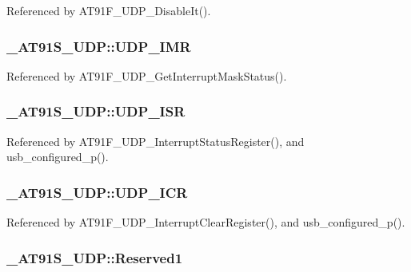 Referenced by AT91F\_\-UDP\_\-DisableIt().\hypertarget{struct__AT91S__UDP_deaa26682a0a229b8560074ce9030351}{
\subsubsection{ {\bf \_\-AT91S\_\-UDP::UDP\_\-IMR}}}
\label{struct__AT91S__UDP_deaa26682a0a229b8560074ce9030351}




Referenced by AT91F\_\-UDP\_\-GetInterruptMaskStatus().\hypertarget{struct__AT91S__UDP_83b861d5cf938b16d0f9a2b06ad428d9}{
\subsubsection{ {\bf \_\-AT91S\_\-UDP::UDP\_\-ISR}}}
\label{struct__AT91S__UDP_83b861d5cf938b16d0f9a2b06ad428d9}




Referenced by AT91F\_\-UDP\_\-InterruptStatusRegister(), and usb\_\-configured\_\-p().\hypertarget{struct__AT91S__UDP_a3b6e0d2334899b4d3c77665b38650ff}{
\subsubsection{ {\bf \_\-AT91S\_\-UDP::UDP\_\-ICR}}}
\label{struct__AT91S__UDP_a3b6e0d2334899b4d3c77665b38650ff}




Referenced by AT91F\_\-UDP\_\-InterruptClearRegister(), and usb\_\-configured\_\-p().\hypertarget{struct__AT91S__UDP_269c69151e7a68327cfc230b3f694508}{
\subsubsection{ {\bf \_\-AT91S\_\-UDP::Reserved1}}}
\label{struct__AT91S__UDP_269c69151e7a68327cfc230b3f694508}


